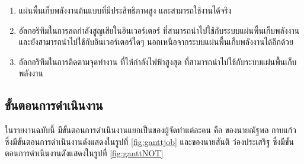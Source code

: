 \documentclass[11pt,a4paper]{article}
\begin{document}
\begin{enumerate}
    \item แผ่นพื้นเก็บพลังงานต้นแบบที่มีประสิทธิภาพสูง และสามารถใช้งานได้จริง
    \item อัลกอริทึมในการลดกำลังสูญเสียในอินเวอร์เตอร์ ที่สามารถนำไปใช้กับระบบแผ่นพื้นเก็บพลังงาน และยังสามารถนำไปใช้กับอินเวอร์เตอร์ใดๆ นอกเหนือจากระบบแผ่นพื้นเก็บพลังงานได้อีกด้วย
    \item อัลกอริทึมในการติดตามจุดทำงาน ที่ให้กำลังไฟฟ้าสูงสุด ที่สามารถนำไปใช้กับระบบแผ่นพื้นเก็บพลังงาน
\end{enumerate}

\subsection{ขั้นตอนการดำเนินงาน}
ในรายงานฉบับนี้ มีขั้นตอนการดำเนินงานแยกเป็นของผู้จัดทำแต่ละคน คือ ของนายณัฐพล กาบแก้ว ซึ่งมีขั้นตอนการดำเนินงานดังแสดงในรูปที่  \ref{fig:ganttjob} และของนายสันติ ว่องประเสริฐ ซึ่งมีขั้นตอนการดำเนินงานดังแสดงในรูปที่ \ref{fig:ganttNOT}
\end{document}
